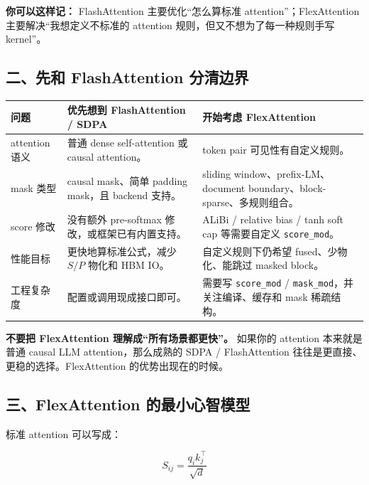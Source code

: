 \begin{intubox}
\textbf{你可以这样记：} FlashAttention 主要优化“怎么算标准 attention”；FlexAttention 主要解决“我想定义不标准的 attention 规则，但又不想为了每一种规则手写 kernel”。
\end{intubox}

\subsection{二、先和 FlashAttention 分清边界}

\begin{center}
{\small
\begin{tabular}{p{3.0cm}p{5.0cm}p{5.0cm}}
\hline
\textbf{问题} & \textbf{优先想到 FlashAttention / SDPA} & \textbf{开始考虑 FlexAttention} \\
\hline
attention 语义 & 普通 dense self-attention 或 causal attention。 & token pair 可见性有自定义规则。 \\
mask 类型 & causal mask、简单 padding mask，且 backend 支持。 & sliding window、prefix-LM、document boundary、block-sparse、多规则组合。 \\
score 修改 & 没有额外 pre-softmax 修改，或框架已有内置支持。 & ALiBi / relative bias / tanh soft cap 等需要自定义 \texttt{score\_mod}。 \\
性能目标 & 更快地算标准公式，减少 $S/P$ 物化和 HBM IO。 & 自定义规则下仍希望 fused、少物化、能跳过 masked block。 \\
工程复杂度 & 配置或调用现成接口即可。 & 需要写 \texttt{score\_mod} / \texttt{mask\_mod}，并关注编译、缓存和 mask 稀疏结构。 \\
\hline
\end{tabular}
}
\end{center}

\begin{warnbox}
\textbf{不要把 FlexAttention 理解成“所有场景都更快”。} 如果你的 attention 本来就是普通 causal LLM attention，那么成熟的 SDPA / FlashAttention 往往是更直接、更稳的选择。FlexAttention 的优势出现在的时候。
\end{warnbox}

\subsection{三、FlexAttention 的最小心智模型}

标准 attention 可以写成：

\[
S_{ij}=\frac{q_i k_j^\top}{\sqrt d}
\]

